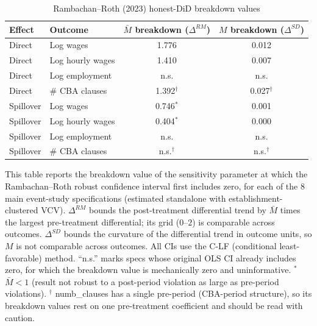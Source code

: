 \begin{table}[H]
\centering
\scriptsize
\caption{Rambachan--Roth (2023) honest-DiD breakdown values}
\label{tab:honest_did_breakdown}
\begin{tabular}{llcc}
\hline\hline
Effect & Outcome & $\bar{M}$ breakdown ($\Delta^{RM}$) & $M$ breakdown ($\Delta^{SD}$) \\
\hline
Direct & Log wages & 1.776 & 0.012 \\
Direct & Log hourly wages & 1.410 & 0.007 \\
Direct & Log employment & n.s. & n.s. \\
Direct & # CBA clauses & 1.392$^{\dagger}$ & 0.027$^{\dagger}$ \\
\hline
Spillover & Log wages & 0.746$^{\ast}$ & 0.001 \\
Spillover & Log hourly wages & 0.404$^{\ast}$ & 0.000 \\
Spillover & Log employment & n.s. & n.s. \\
Spillover & # CBA clauses & n.s.$^{\dagger}$ & n.s.$^{\dagger}$ \\
\hline
\end{tabular}
\begin{minipage}{0.92\textwidth}\scriptsize This table reports the breakdown value of the sensitivity parameter at which the Rambachan--Roth robust confidence interval first includes zero, for each of the 8 main event-study specifications (estimated standalone with establishment-clustered VCV). $\Delta^{RM}$ bounds the post-treatment differential trend by $\bar{M}$ times the largest pre-treatment differential; its grid ($0$--$2$) is comparable across outcomes. $\Delta^{SD}$ bounds the curvature of the differential trend in outcome units, so $M$ is not comparable across outcomes. All CIs use the C-LF (conditional least-favorable) method. ``n.s.'' marks specs whose original OLS CI already includes zero, for which the breakdown value is mechanically zero and uninformative. $^{\ast}$ $\bar{M}<1$ (result not robust to a post-period violation as large as pre-period violations). $^{\dagger}$ numb\_clauses has a single pre-period (CBA-period structure), so its breakdown values rest on one pre-treatment coefficient and should be read with caution. \end{minipage}
\end{table}